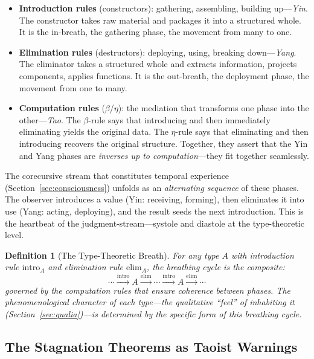 \documentclass[12pt,a4paper]{article}
\newtheorem{definition}{Definition}[section]
\begin{document}
\begin{itemize}[leftmargin=2em]
\item \textbf{Introduction rules} (constructors): gathering, assembling, building up---\emph{Yin}. The constructor takes raw material and packages it into a structured whole. It is the in-breath, the gathering phase, the movement from many to one.

\item \textbf{Elimination rules} (destructors): deploying, using, breaking down---\emph{Yang}. The eliminator takes a structured whole and extracts information, projects components, applies functions. It is the out-breath, the deployment phase, the movement from one to many.

\item \textbf{Computation rules} ($\beta$/$\eta$): the mediation that transforms one phase into the other---\emph{Tao}. The $\beta$-rule says that introducing and then immediately eliminating yields the original data. The $\eta$-rule says that eliminating and then introducing recovers the original structure. Together, they assert that the Yin and Yang phases are \emph{inverses up to computation}---they fit together seamlessly.
\end{itemize}

The corecursive stream that constitutes temporal experience (Section~\ref{sec:consciousness}) unfolds as an \emph{alternating sequence} of these phases. The observer introduces a value (Yin: receiving, forming), then eliminates it into use (Yang: acting, deploying), and the result seeds the next introduction. This is the heartbeat of the judgment-stream---systole and diastole at the type-theoretic level.

\begin{definition}[The Type-Theoretic Breath]
For any type $A$ with introduction rule $\mathrm{intro}_A$ and elimination rule $\mathrm{elim}_A$, the \emph{breathing cycle} is the composite:
\[
\cdots \xrightarrow{\mathrm{intro}} A \xrightarrow{\mathrm{elim}} \cdots \xrightarrow{\mathrm{intro}} A \xrightarrow{\mathrm{elim}} \cdots
\]
governed by the computation rules that ensure coherence between phases. The phenomenological character of each type---the qualitative ``feel'' of inhabiting it (Section~\ref{sec:qualia})---is determined by the specific form of this breathing cycle.
\end{definition}


\subsection{The Stagnation Theorems as Taoist Warnings}
\label{sec:stagnation}
\end{document}
